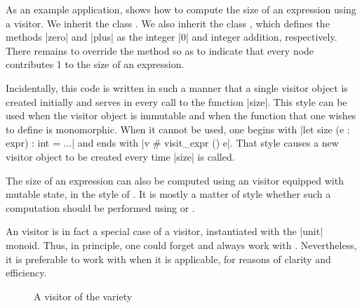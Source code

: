 \documentclass[11pt,a4paper,twoside]{article}
\begin{document}
As an example application,  shows how to compute the size of
an expression using a \reduce visitor. We inherit the class \reduce. We also
inherit the class , which defines the
methods \oc|zero| and \oc|plus| as the integer \oc|0| and integer addition,
respectively. There remains to override the method  so as
to indicate that every node contributes 1 to the size of an expression.

Incidentally, this code is written in such a manner that a single visitor
object is created initially and serves in every call to the function
\oc|size|. This style can be used when the visitor object is immutable and
when the function that one wishes to define is monomorphic. When it cannot be
used, one begins with \oc|let size (e : expr) : int = ...| and ends with %
\oc|v # visit_expr () e|. That style causes a new visitor object to be created
every time \oc|size| is called.

The size of an expression can also be computed using an \iter visitor equipped
with mutable state, in the style of . It is mostly a matter
of style whether such a computation should be performed using \iter or
\reduce.

An \iter visitor is in fact a special case of a \reduce visitor, instantiated
with the \oc|unit| monoid. Thus, in principle, one could forget \iter and
always work with \reduce. Nevertheless, it is preferable to work with \iter
when it is applicable, for reasons of clarity and efficiency.



\begin{figure}[p]
\vspace{-\baselineskip}
\caption{A visitor of the \mapreduce variety}
\label{fig:mapreduce}
\end{figure}
\end{document}
